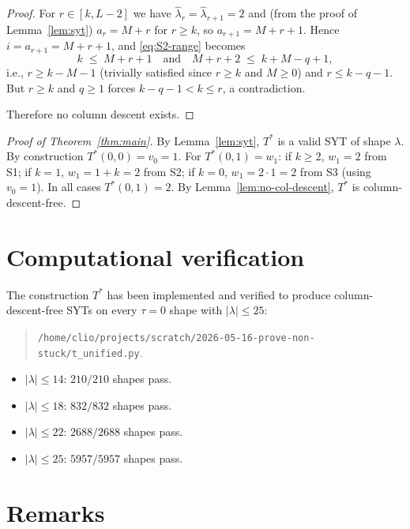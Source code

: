 \documentclass[11pt]{article}
\theoremstyle{definition}
\newcommand{\hatl}{\widehat\lambda}
\begin{document}
\begin{proof}
For $r \in [k, L-2]$ we have $\hatl_r = \hatl_{r+1} = 2$ and (from
the proof of Lemma~\ref{lem:syt}) $a_{r} = M + r$ for $r \ge k$, so
$a_{r+1} = M + r + 1$.  Hence $i = a_{r+1} = M + r + 1$, and
\eqref{eq:S2-range} becomes
\[
   k \;\le\; M + r + 1 \quad\text{and}\quad M + r + 2 \;\le\; k + M - q + 1,
\]
i.e., $r \ge k - M - 1$ (trivially satisfied since $r \ge k$ and
$M \ge 0$) and $r \le k - q - 1$.  But $r \ge k$ and $q \ge 1$ forces
$k - q - 1 < k \le r$, a contradiction.

Therefore no column descent exists.
\end{proof}

\begin{proof}[Proof of Theorem~\ref{thm:main}]
By Lemma~\ref{lem:syt}, $T^*$ is a valid SYT of shape $\lambda$.  By
construction $T^*(0,0) = v_0 = 1$.  For $T^*(0,1) = w_1$: if $k \ge 2$,
$w_1 = 2$ from S1; if $k = 1$, $w_1 = 1 + k = 2$ from S2; if $k = 0$,
$w_1 = 2 \cdot 1 = 2$ from S3 (using $v_0 = 1$).  In all cases
$T^*(0,1) = 2$.  By Lemma~\ref{lem:no-col-descent}, $T^*$ is
column-descent-free.
\end{proof}

\section{Computational verification}\label{sec:computation}

The construction $T^*$ has been implemented and verified to produce
column-descent-free SYTs on every $\tau = 0$ shape with $|\lambda|
\le 25$:

\begin{quote}
\verb|/home/clio/projects/scratch/2026-05-16-prove-non-stuck/t_unified.py|.
\end{quote}

\begin{itemize}
\item $|\lambda| \le 14$: $210/210$ shapes pass.
\item $|\lambda| \le 18$: $832/832$ shapes pass.
\item $|\lambda| \le 22$: $2688/2688$ shapes pass.
\item $|\lambda| \le 25$: $5957/5957$ shapes pass.
\end{itemize}

\section{Remarks}\label{sec:remarks}
\end{document}
